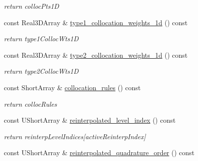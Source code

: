 \begin{DoxyCompactItemize}
\begin{DoxyCompactList}\small\item\em return colloc\+Pts1D \end{DoxyCompactList}\item 
const Real3\+D\+Array \& \hyperlink{classPecos_1_1IntegrationDriver_ad6170aa4e92461ebca5e36ad348f82b3}{type1\+\_\+collocation\+\_\+weights\+\_\+1d} () const \label{classPecos_1_1IntegrationDriver_ad6170aa4e92461ebca5e36ad348f82b3}

\begin{DoxyCompactList}\small\item\em return type1\+Colloc\+Wts1D \end{DoxyCompactList}\item 
const Real3\+D\+Array \& \hyperlink{classPecos_1_1IntegrationDriver_a91e8412c2c4ee9a7bdc0f4d67922c03e}{type2\+\_\+collocation\+\_\+weights\+\_\+1d} () const \label{classPecos_1_1IntegrationDriver_a91e8412c2c4ee9a7bdc0f4d67922c03e}

\begin{DoxyCompactList}\small\item\em return type2\+Colloc\+Wts1D \end{DoxyCompactList}\item 
const Short\+Array \& \hyperlink{classPecos_1_1IntegrationDriver_a2b29939dfa7c8ae5fb55e0bdc321a140}{collocation\+\_\+rules} () const \label{classPecos_1_1IntegrationDriver_a2b29939dfa7c8ae5fb55e0bdc321a140}

\begin{DoxyCompactList}\small\item\em return colloc\+Rules \end{DoxyCompactList}\item 
const U\+Short\+Array \& \hyperlink{classPecos_1_1IntegrationDriver_af8a53a60055413e18c885193ada0701e}{reinterpolated\+\_\+level\+\_\+index} () const \label{classPecos_1_1IntegrationDriver_af8a53a60055413e18c885193ada0701e}

\begin{DoxyCompactList}\small\item\em return reinterp\+Level\+Indices\mbox{[}active\+Reinterp\+Index\mbox{]} \end{DoxyCompactList}\item 
const U\+Short\+Array \& \hyperlink{classPecos_1_1IntegrationDriver_a1f1fa0a82db79b4e231011ca3a027837}{reinterpolated\+\_\+quadrature\+\_\+order} () const \label{classPecos_1_1IntegrationDriver_a1f1fa0a82db79b4e231011ca3a027837}


\end{DoxyCompactItemize}
